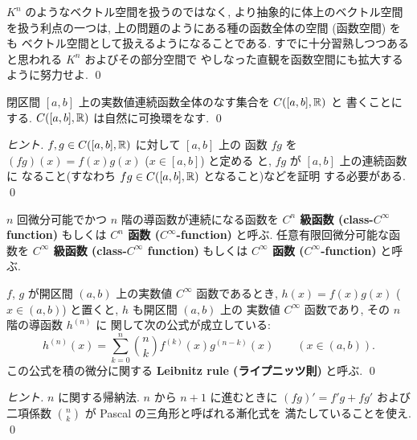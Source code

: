 \documentclass[12pt,twoside]{jarticle}
\begin{document}
\begin{guide}
  $K^n$ のようなベクトル空間を扱うのではなく, 
  より抽象的に体上のベクトル空間を扱う利点の一つは, 
  上の問題のようにある種の函数全体の空間 (函数空間) をも
  ベクトル空間として扱えるようになることである.
  すでに十分習熟しつつあると思われる $K^n$ およびその部分空間で
  やしなった直観を函数空間にも拡大するように努力せよ.
  \qed
\end{guide}


\begin{question}[連続函数全体のなす可換環, 5点]
  \label{q:C0-2}
  閉区間 $[a,b]$ 上の実数値連続函数全体のなす集合を $C([a,b],{\mathbb R})$ と
  書くことにする. $C([a,b],{\mathbb R})$ は自然に可換環をなす.
  \qed
\end{question}

\begin{proof}[ヒント]
  $f,g\in C([a,b],{\mathbb R})$ に対して $[a,b]$ 上の
  函数 $fg$ を $(fg)(x)=f(x)g(x)$ ($x\in[a,b]$) と定める
  と, $fg$ が $[a,b]$ 上の連続函数に
  なること(すなわち $fg\in C([a,b],{\mathbb R})$ となること)などを証明
  する必要がある.
  \qed
\end{proof}


$n$ 回微分可能でかつ $n$ 階の導函数が連続になる函数を 
{\bf $C^n$ 級函数 (class-$C^\infty$ function)} 
もしくは 
{\bf $C^n$ 函数 ($C^\infty$-function)} と呼ぶ.  
任意有限回微分可能な函数を 
{\bf $C^\infty$ 級函数 (class-$C^\infty$ function)}
もしくは 
{\bf $C^\infty$ 函数 ($C^\infty$-function)} と呼ぶ.

\begin{question}
  \label{q:Leibnitz-rule}
  $f$, $g$ が開区間 $(a,b)$ 上の実数値 $C^\infty$ 函数であるとき, %
  $h(x)=f(x)g(x)$ ($x\in(a,b)$) と置くと, $h$ も開区間 $(a,b)$ 上の
  実数値 $C^\infty$ 函数であり, その $n$ 階の導函数 $h^{(n)}$ に
  関して次の公式が成立している:
  \begin{equation*}
    h^{(n)}(x) = \sum_{k=0}^n \binom{n}{k} f^{(k)}(x) g^{(n-k)}(x)
    \qquad (x\in(a,b)).
  \end{equation*}
  この公式を積の微分に関する {\bf Leibnitz rule (ライプニッツ則)}
  と呼ぶ. \qed
\end{question}

\begin{proof}[ヒント]
  $n$ に関する帰納法.
  $n$ から $n+1$ に進むときに $(fg)' = f'g + fg'$ および
  二項係数 $\binom{n}{k}$ が Pascal の三角形と呼ばれる漸化式を
  満たしていることを使え.
  \qed
\end{proof}
\end{document}
